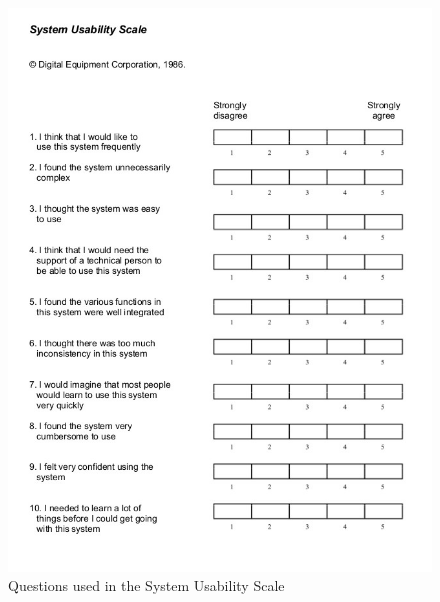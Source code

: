 \documentclass[a4paper,12pt]{kth-mag}
\begin{document}
\begin{figure}[ht]
	\centering
	\includegraphics[keepaspectratio, scale = 0.8]{images/sus_quest.jpg}
	\caption{\small{Questions used in the System Usability Scale}}\label{Quest}
\end{figure}
\end{document}
